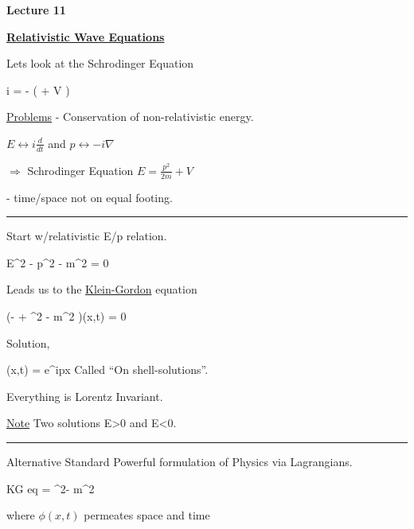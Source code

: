 \def\adagger{\ensuremath{a_{p\sigma}^\dagger}}


\usepackage{fancyhdr}

\fancyhf{}


\thispagestyle{fancy}

\begin{center}
{\huge \textbf{Lecture 11}}
\end{center}

{\fontsize{14}{16}\selectfont

\textbf{\underline{Relativistic Wave Equations}} 

Lets look at the Schrodinger Equation

\be
i \psi = - \left(  + V \right) \psi
\ee

\underline{Problems} 
- Conservation of non-relativistic energy.


$E \leftrightarrow i \frac{d}{dt}$ 
and
$p \leftrightarrow -i \nabla$


$\Rightarrow$ Schrodinger Equation $E = \frac{p^2}{2m} + V$

- time/space not on equal footing.


\noindent\rule{\textwidth}{1pt}

Start w/relativistic E/p relation.


\be
E^2 - p^2 - m^2 = 0
\ee

Leads us to the \underline{Klein-Gordon} equation


\be
\left(- + \nabla^2 - m^2 \right)\phi(x,t) = 0
\ee


Solution, 

\be
\phi(x,t) = e^{ipx}
\ee
Called ``On shell-solutions''.

Everything is Lorentz Invariant. 

\underline{Note} Two solutions E>0 and E<0.

\noindent\rule{\textwidth}{1pt}

Alternative Standard Powerful formulation of Physics via Lagrangians.

KG eq
\be
{}\phi  =  \nabla^2\phi - m^2 \phi
\ee

where $\phi(x,t)$ permeates space and time

}
